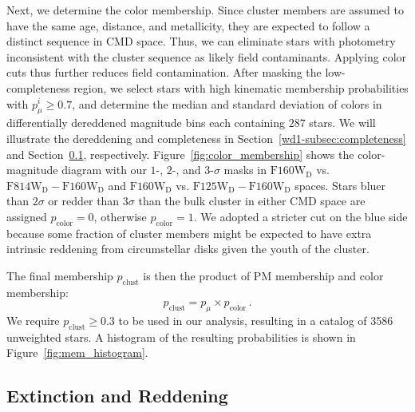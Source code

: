\documentclass[12pt]{ucsddissertation}
\newcommand{\pmui}{p_{\mu}^i}
\newcommand{\pcol}{p_{\mathrm{color}}}
\begin{document}
\begin{CJK*}{UTF8}{gbsn}
Next, we determine the color membership. Since cluster members are assumed to have the same age, distance, and metallicity, they are expected to follow a distinct sequence in CMD space.  Thus, we can eliminate stars with photometry inconsistent with the cluster sequence as likely field contaminants.  Applying color cuts thus further reduces field contamination. After masking the low-completeness region, we select stars with high kinematic membership probabilities with $\pmui \geq 0.7$, and determine the median and standard deviation of colors in differentially dereddened magnitude bins each containing $287$ stars. We will illustrate the dereddening and completeness in Section~\ref{wd1-subsec:completeness} and Section~\ref{wd1-subsec:extinction}, respectively. Figure~\ref{fig:color_membership} shows the color-magnitude diagram with our $1$-, $2$-, and $3$-$\sigma$ masks in $\mathrm{F160W_D}$ vs. $\mathrm{F814W_D} - \mathrm{F160W_D}$ and $\mathrm{F160W_D}$ vs. $\mathrm{F125W_D} - \mathrm{F160W_D}$ spaces. Stars bluer than $2\sigma$ or redder than $3\sigma$ than the bulk cluster in either CMD space are assigned $\pcol = 0$, otherwise $\pcol = 1$. We adopted a stricter cut on the blue side because some fraction of cluster members might be expected to have extra intrinsic reddening from circumstellar disks given the youth of the cluster.

The final membership $p_{\mathrm{clust}}$ is then the product of PM membership and color membership:
\begin{equation}
    p_\mathrm{clust} = p_\mu \times p_\mathrm{color}\,.
\end{equation}
We require $p_{\mathrm{clust}} \geq 0.3$ to be used in our analysis, resulting in a catalog of \num{3586} unweighted stars. A histogram of the resulting probabilities is shown in Figure~\ref{fig:mem_histogram}.

\subsection{Extinction and Reddening}
\label{wd1-subsec:extinction}



\end{CJK*}
\end{document}
